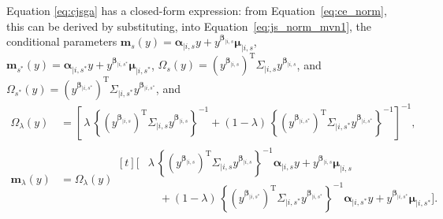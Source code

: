 \documentclass[12pt,compact]{article}
\newcommand{\mvmean}[1]{\symbf{\alpha}_{\mid i, #1} y + y^{\symbf{\beta}_{\mid i, #1}} \symbf{\mu}_{\mid i, #1}}
\newcommand{\mvcov}[1]{\left(y^{\symbf{\beta}_{\mid i, #1}}\right)^{\mathrm{T}} \Sigma_{\mid i, #1} y^{\symbf{\beta}_{\mid i, #1}}}
\begin{document}
Equation \eqref{eq:cjsga} has a closed-form expression: from Equation~\eqref{eq:ce_norm}, this can be derived by substituting, into Equation~\eqref{eq:js_norm_mvn1}, the conditional parameters $\symbf{m}_{s}(y) = \mvmean{s}$, $\symbf{m}_{s^*}(y) = \mvmean{s^*}$, $\Omega_{s}(y) = \mvcov{s}$, and $\Omega_{s^*}(y) = \mvcov{s^*}$, 
and 
\begin{align*}
\Omega_{\lambda}(y)
  &= \left[\,\lambda\,\left\{\mvcov{s}\right\}^{-1}
           +(1-\lambda)\,\left\{\mvcov{s^{*}}\right\}^{-1}\right]^{-1},\\[6pt]
\symbf{m}_{\lambda}(y)
  &= \Omega_{\lambda}(y)
     \begin{aligned}[t]
       \Biggl[&\lambda\,\left\{\mvcov{s}\right\}^{-1}\mvmean{s}\\
            &\quad +(1-\lambda)\,\left\{\mvcov{s^{*}}\right\}^{-1}\mvmean{s^{*}}\Biggr].
     \end{aligned}
\end{align*}
\end{document}
